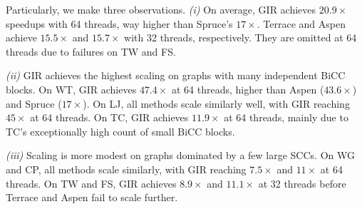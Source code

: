 Particularly, we make three observations.
\textit{(i)} On average, GIR achieves $20.9\times$ speedups with 64 threads, way higher than Spruce's $17\times$.
Terrace and Aspen achieve $15.5\times$ and $15.7\times$ with 32 threads, respectively. They are omitted at 64 threads due to failures on TW and FS.




\textit{(ii)} GIR achieves the highest scaling on graphs with many independent BiCC blocks.
On WT, GIR achieves $47.4\times$ at 64 threads, higher than Aspen ($43.6\times$) and Spruce ($17\times$).
On LJ, all methods scale similarly well, with GIR reaching $45\times$ at 64 threads.
On TC, GIR achieves $11.9\times$ at 64 threads, mainly due to TC's exceptionally high count of small BiCC blocks.


\textit{(iii)} Scaling is more modest on graphs dominated by a few large SCCs.
On WG and CP, all methods scale similarly, with GIR reaching $7.5\times$ and $11\times$ at 64 threads.
On TW and FS, GIR achieves $8.9\times$ and $11.1\times$ at 32 threads before Terrace and Aspen fail to scale further.

